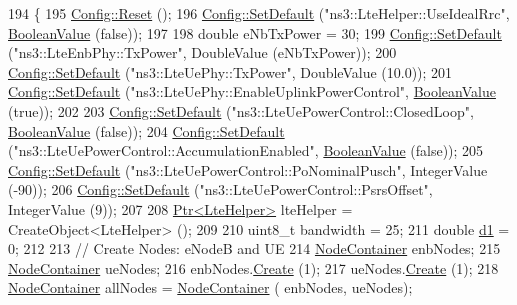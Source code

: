 \begin{DoxyCode}
194 \{
195   \hyperlink{group__config_ga2c1b65724f42f8c72276d7e7ad6df6db}{Config::Reset} ();
196   \hyperlink{group__config_ga2e7882df849d8ba4aaad31c934c40c06}{Config::SetDefault} (\textcolor{stringliteral}{"ns3::LteHelper::UseIdealRrc"}, 
      \hyperlink{classns3_1_1BooleanValue}{BooleanValue} (\textcolor{keyword}{false}));
197 
198   \textcolor{keywordtype}{double} eNbTxPower = 30;
199   \hyperlink{group__config_ga2e7882df849d8ba4aaad31c934c40c06}{Config::SetDefault} (\textcolor{stringliteral}{"ns3::LteEnbPhy::TxPower"}, DoubleValue (eNbTxPower));
200   \hyperlink{group__config_ga2e7882df849d8ba4aaad31c934c40c06}{Config::SetDefault} (\textcolor{stringliteral}{"ns3::LteUePhy::TxPower"}, DoubleValue (10.0));
201   \hyperlink{group__config_ga2e7882df849d8ba4aaad31c934c40c06}{Config::SetDefault} (\textcolor{stringliteral}{"ns3::LteUePhy::EnableUplinkPowerControl"}, 
      \hyperlink{classns3_1_1BooleanValue}{BooleanValue} (\textcolor{keyword}{true}));
202 
203   \hyperlink{group__config_ga2e7882df849d8ba4aaad31c934c40c06}{Config::SetDefault} (\textcolor{stringliteral}{"ns3::LteUePowerControl::ClosedLoop"}, 
      \hyperlink{classns3_1_1BooleanValue}{BooleanValue} (\textcolor{keyword}{false}));
204   \hyperlink{group__config_ga2e7882df849d8ba4aaad31c934c40c06}{Config::SetDefault} (\textcolor{stringliteral}{"ns3::LteUePowerControl::AccumulationEnabled"}, 
      \hyperlink{classns3_1_1BooleanValue}{BooleanValue} (\textcolor{keyword}{false}));
205   \hyperlink{group__config_ga2e7882df849d8ba4aaad31c934c40c06}{Config::SetDefault} (\textcolor{stringliteral}{"ns3::LteUePowerControl::PoNominalPusch"}, IntegerValue (-90));
206   \hyperlink{group__config_ga2e7882df849d8ba4aaad31c934c40c06}{Config::SetDefault} (\textcolor{stringliteral}{"ns3::LteUePowerControl::PsrsOffset"}, IntegerValue (9));
207 
208   \hyperlink{classns3_1_1Ptr}{Ptr<LteHelper>} lteHelper = CreateObject<LteHelper> ();
209 
210   uint8\_t bandwidth = 25;
211   \textcolor{keywordtype}{double} \hyperlink{lte__link__budget__interference_8m_ab5ca0c44c6f0a063a5219b3749db661f}{d1} = 0;
212 
213   \textcolor{comment}{// Create Nodes: eNodeB and UE}
214   \hyperlink{classns3_1_1NodeContainer}{NodeContainer} enbNodes;
215   \hyperlink{classns3_1_1NodeContainer}{NodeContainer} ueNodes;
216   enbNodes.\hyperlink{classns3_1_1NodeContainer_a787f059e2813e8b951cc6914d11dfe69}{Create} (1);
217   ueNodes.\hyperlink{classns3_1_1NodeContainer_a787f059e2813e8b951cc6914d11dfe69}{Create} (1);
218   \hyperlink{classns3_1_1NodeContainer}{NodeContainer} allNodes = \hyperlink{classns3_1_1NodeContainer}{NodeContainer} ( enbNodes, ueNodes);

\end{DoxyCode}

